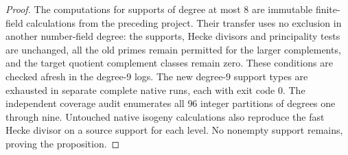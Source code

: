 \begin{proof}
The computations for supports of degree at most $8$ are immutable
finite-field calculations from the preceding project. Their transfer
uses no exclusion in another number-field degree: the supports,
Hecke divisors and principality tests are unchanged, all the old primes
remain permitted for the larger complements, and the target quotient
complement classes remain zero. These conditions are checked afresh
in the degree-$9$ logs. The new degree-$9$ support types are exhausted
in separate complete native runs, each with exit code $0$.
The independent coverage audit enumerates all $96$ integer partitions
of degrees one through nine. Untouched native isogeny calculations
also reproduce the fast Hecke divisor on a source support for each level. No nonempty support remains, proving the proposition.
\end{proof}

